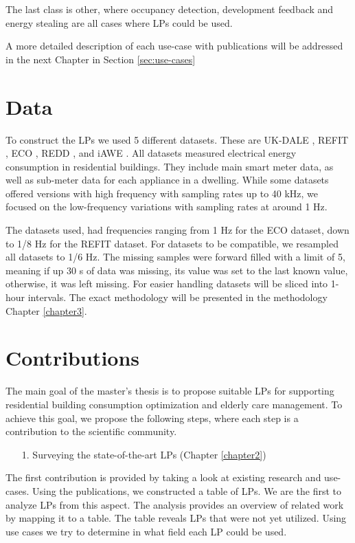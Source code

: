 The last class is other, where occupancy detection, development feedback and energy stealing are all cases where LPs could be used. 

A more detailed description of each use-case with publications will be addressed in the next Chapter in Section \ref{sec:use-cases}

\section{Data}
\label{sec:data}
To construct the LPs we used 5 different datasets.
These are UK-DALE \cite{UKDALE}, REFIT \cite{REFIT}, ECO \cite{ECO}, REDD \cite{REDD}, and iAWE \cite{iAWE}.
All datasets measured electrical energy consumption in residential buildings.
They include main smart meter data, as well as sub-meter data for each appliance in a dwelling. 
While some datasets offered versions with high frequency with sampling rates up to 40 kHz,
we focused on the low-frequency variations with sampling rates at around 1 Hz.

The datasets used, had frequencies ranging from 1 Hz for the ECO dataset, down to 1/8 Hz for the REFIT dataset.
For datasets to be compatible, we resampled all datasets to 1/6 Hz.
The missing samples were forward filled with a limit of 5, meaning if up 30 s of data was missing, its value was set to the last known value, otherwise, it was left missing.
For easier handling datasets will be sliced into 1-hour intervals.
The exact methodology will be presented in the methodology Chapter \ref{chapter3}. 

\section{Contributions}
\label{sec:contributions} 

The main goal of the master's thesis is to propose suitable LPs for supporting residential building consumption optimization and elderly care management.
To achieve this goal, we propose the following steps, where each step is a contribution to the scientific community.

\begin{enumerate}
	\item[1.] Surveying the state-of-the-art LPs (Chapter \ref{chapter2})
\end{enumerate}

The first contribution is provided by taking a look at existing research and use-cases. 
Using the publications, we constructed a table of LPs.
We are the first to analyze LPs from this aspect. 
The analysis provides an overview of related work by mapping it to a table.
The table reveals LPs that were not yet utilized.
Using use cases we try to determine in what field each LP could be used.

